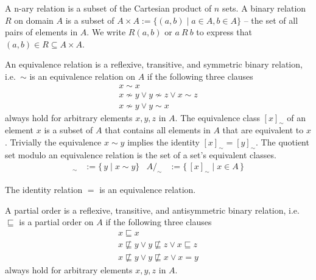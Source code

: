 \begin{definition}
	A n-ary relation is a subset of the Cartesian product of $n$ sets.
	A {\myem binary relation} $R$ on domain $A$ 
	is a subset of $A \times A := \{ (a,b) \mid a\in A, b\in A \}$ -- 
	the set of all pairs of elements in $A$.
	We write $R(a,b)$ or $a\ R\ b$ to express that $(a,b)\in R \subseteq A\times A$.
\end{definition}
\begin{definition}
	An {\myem equivalence relation} 
	is a reflexive, transitive, and symmetric binary relation, 
	i.e.~$\sim$ is an equivalence relation on $A$ if the following three clauses
	\begin{align*}
	x\sim x
	\tag*{reflexivivity}
	\\
	x\not\sim y \lor  y \not\sim z \lor x\sim z
	\tag*{transitivity}
	\\
	x\not\sim y \lor y\sim x
	\tag*{symmetry}
	\end{align*}
	always hold for arbitrary elements $x,y,z$ in $A$.
	The {\myem equivalence class} $[x]_\sim$
	of an element $x$ is a subset of $A$ that contains all elements in $A$ that are equivalent to $x$.
	Trivially the equivalence $x\sim y$ implies the identity $[x]_\sim = [y]_\sim$.
	The quotient set modulo an equivalence relation is the set of a set's equivalent classes.
	\begin{align*} 
	[x]_\sim &:= \{\, y \mid x \sim y\} &
	A/_{\!\sim} &:= \{\, [x]_\sim \mid x \in A \,\} 
	\end{align*} 
\end{definition}

\begin{lemma}
	The identity relation $=$ is an equivalence relation.
\end{lemma}

\begin{definition}
	A {\myem partial order} is a reflexive, transitive, and antisymmetric binary relation, 
	i.e.~$\sqsubseteq$ is a partial order on $A$ if
	the following three clauses
	\begin{align*}
	x\sqsubseteq x
	\tag*{reflexivivity}
	\\
	x\not\sqsubseteq y \lor  y \not\sqsubseteq z \lor x\sqsubseteq z
	\tag*{transitivity}
	\\
	x\not\sqsubseteq y \lor y\not\sqsubseteq x \lor x = y
	\tag*{antisymmetry}
	\end{align*}
	always hold for arbitrary elements $x,y,z$ in $A$.
\end{definition}

